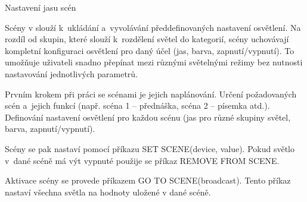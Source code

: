 \medskip \noindent
{\sbf Nastavení jasu scén}


Scény v  slouží k~ukládání a~vyvolávání předdefinovaných nastavení osvětlení.
Na rozdíl od skupin, které slouží k~rozdělení světel do kategorií, scény uchovávají
kompletní konfiguraci osvětlení pro daný účel (jas, barva, zapnutí/vypnutí).
To umožňuje uživateli snadno přepínat mezi různými světelnými režimy bez nutnosti
 nastavování jednotlivých parametrů.


Prvním krokem při práci se scénami je jejich naplánování.
Určení požadovaných scén a~jejich funkcí (např. scéna 1 -- přednáška, scéna 2 -- písemka atd.).
Definování nastavení osvětlení pro každou scénu (jas pro různé skupiny světel, barva, zapnutí/vypnutí).

Scény se pak nastaví pomocí příkazu SET SCENE(device, value). Pokud světlo v~dané scéně má výt vypnuté
použije se příkaz REMOVE FROM SCENE.

Aktivace scény se provede příkazem GO TO SCENE(broadcast). Tento příkaz nastaví všechna
světla na hodnoty uložené v dané scéně.



